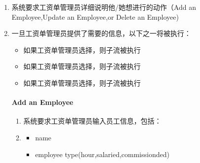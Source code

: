 \documentclass{article}
\begin{document}
\begin{enumerate}%

\item{}
系统要求工资单管理员详细说明他/她想进行的动作（Add an Employee,Update an Employee,or Delete an Employee)%

\item{}
一旦工资单管理员提供了需要的信息，以下之一将被执行：%

\begin{itemize}[noitemsep,topsep=\mdcompacttopsep]%

\item{}如果工资单管理员选择，则子流被执行%

\item{}如果工资单管理员选择，则子流被执行%

\item{}如果工资单管理员选择，则子流被执行%
\end{itemize}%

\paragraph{Add an Employee}\label{sec-add-an-employee}%

\begin{enumerate}%

\item{}
系统要求工资单管理员输入员工信息，包括：%

\item{}
\begin{itemize}[noitemsep,topsep=\mdcompacttopsep]%

\item{}name%

\item{}employee type(hour,salaried,commissionded)%


\end{itemize}
\end{enumerate}
\end{enumerate}
\end{document}
